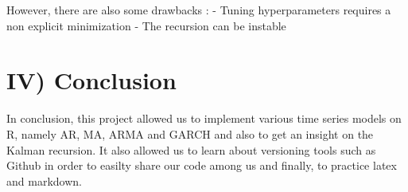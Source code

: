 \documentclass[]{article}
\begin{document}
However, there are also some drawbacks : - Tuning hyperparameters
requires a non explicit minimization - The recursion can be instable

\section{IV) Conclusion}

In conclusion, this project allowed us to implement various time series
models on R, namely AR, MA, ARMA and GARCH and also to get an insight on
the Kalman recursion. It also allowed us to learn about versioning tools
such as Github in order to easilty share our code among us and finally,
to practice latex and markdown.
\end{document}
